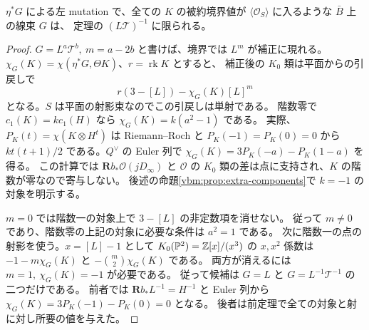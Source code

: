 \begin{corollary}[底の線束一つによる補正の一意性]\label{vbm:cor:unique-line}
$\eta^*G$ による左 mutation で、全ての $K$ の被約境界値が
$\langle\mathcal O_S\rangle$ に入るような $\bar B$ 上の線束 $G$ は、
定理の $(L\mathcal T)^{-1}$ に限られる。
\end{corollary}
\begin{proof}
$G=L^a\mathcal T^b,\ m=a-2b$ と書けば、境界では $L^m$ が補正に現れる。
$\chi_G(K)=\chi(\eta^*G,\Theta K)$、$r=\operatorname{rk}K$ とすると、
補正後の $K_0$ 類は平面からの引戻しで
\[
              r(3-[L])-\chi_G(K)[L]^m
\]
となる。$S$ は平面の射影束なのでこの引戻しは単射である。
階数零で $c_1(K)=k c_1(H)$ なら $\chi_G(K)=k(a^2-1)$ である。
実際、$P_K(t)=\chi(K\otimes H^t)$ は Riemann--Roch と $P_K(-1)=P_K(0)=0$
から $k t(t+1)/2$ である。$Q^\vee$ の Euler 列で
$\chi_G(K)=3P_K(-a)-P_K(1-a)$ を得る。
この計算では $\mathbf R b_*\mathcal O(jD_\infty)$ と $\mathcal O$ の
$K_0$ 類の差は点に支持され、$K$ の階数が零なので寄与しない。
後述の命題\ref{vbm:prop:extra-components}で $k=-1$ の対象を明示する。

$m=0$ では階数一の対象上で $3-[L]$ の非定数項を消せない。
従って $m\ne0$ であり、階数零の上記の対象に必要な条件は $a^2=1$ である。
次に階数一の点の射影を使う。$x=[L]-1$ として
$K_0(\mathbb P^2)=\mathbb Z[x]/(x^3)$ の $x,x^2$ 係数は
$-1-m\chi_G(K)$ と $-\binom m2\chi_G(K)$ である。
両方が消えるには $m=1,\ \chi_G(K)=-1$ が必要である。
従って候補は $G=L$ と $G=L^{-1}\mathcal T^{-1}$ の二つだけである。
前者では $\mathbf R b_*L^{-1}=H^{-1}$ と Euler 列から
$\chi_G(K)=3P_K(-1)-P_K(0)=0$ となる。
後者は前定理で全ての対象と射に対し所要の値を与えた。
\end{proof}

